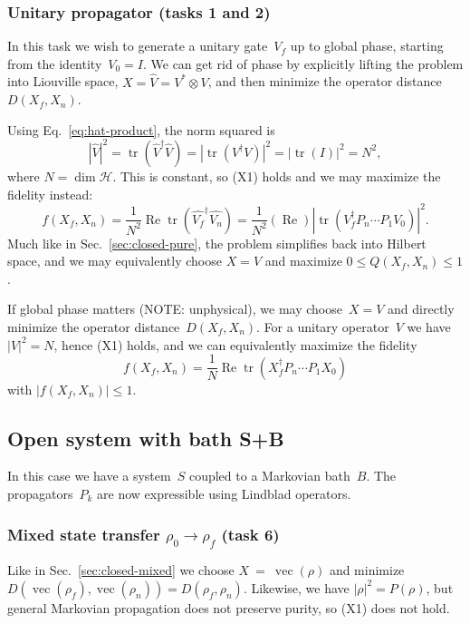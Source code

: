 \documentclass[aps, pra, a4paper, longbibliography]{revtex4}
\newcommand{\I}{I}
\newcommand{\be}{\begin{equation}}
\newcommand{\ee}{\end{equation}}
\newcommand{\hilb}[1]{\mathcal{#1}}
\DeclareMathOperator{\tr}{tr}
\DeclareMathOperator{\re}{Re}
\DeclareMathOperator{\cvec}{vec}
\begin{document}
\subsubsection{Unitary propagator (tasks 1 and 2)}

In this task we wish to generate a unitary gate~$V_f$ up to global
phase, starting from the identity~$V_0 = \I$.
We can get rid of phase by explicitly lifting the problem into Liouville space,
$X = \hat{V} = V^* \otimes V$,
and then minimize the operator distance~$D(X_f, X_n)$.

Using Eq.~\eqref{eq:hat-product}, the norm squared is 
\be
|\hat{V}|^2
= \tr(\hat{V}^\dagger \hat{V})
= |\tr(V^\dagger V)|^2
= |\tr(\I)|^2
= N^2,
\ee
where $N = \dim \hilb{H}$.
This is constant, so (X1) holds and we may maximize the fidelity instead:
\be
f(X_f, X_n)
= \frac{1}{N^2} \re \tr \left(\hat{V_f}^\dagger \hat{V_n} \right)
= \frac{1}{N^2} (\re) \left| \tr \left(V_f^\dagger P_n \cdots P_1 V_0 \right) \right|^2.
\ee
Much like in
Sec.~\ref{sec:closed-pure},
the problem simplifies back into Hilbert space, and we may equivalently
choose $X = V$ and
maximize $0 \le Q(X_f, X_n) \le 1$.


If global phase matters (NOTE: unphysical), we may choose~$X = V$ and directly minimize
the operator distance~$D(X_f, X_n)$.
For a unitary operator~$V$ we have $|V|^2 = N$, hence (X1) holds, and
we can equivalently maximize the fidelity
\be
f(X_f, X_n)
= \frac{1}{N} \re \tr \left(X_f^\dagger P_n \cdots P_1 X_0 \right)
\ee
with $|f(X_f, X_n)| \le 1$.



\subsection{Open system with bath S+B}

In this case we have a system~$S$ coupled to a Markovian bath~$B$.
The propagators~$P_k$ are now expressible using Lindblad operators.


\subsubsection{Mixed state transfer $\rho_0 \to \rho_f$ (task 6)}

Like in Sec.~\ref{sec:closed-mixed} we choose $X~=~\cvec(\rho)$ and
minimize $D(\cvec(\rho_f), \cvec(\rho_n)) = D(\rho_f, \rho_n)$.
Likewise, we have
$|\rho|^2 = P(\rho)$, but general Markovian propagation does not
preserve purity, so (X1) does not hold.
\end{document}

